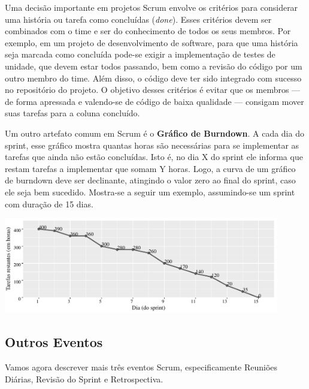 \documentclass[
  11pt,
  twoside]{book}
\let\origfigure\figure
\let\endorigfigure\endfigure
\renewenvironment{figure}[1][2] {
    \expandafter\origfigure\expandafter[!h]
} {
    \endorigfigure
}
\begin{document}

Uma decisão importante em projetos Scrum envolve os critérios para
considerar uma história ou tarefa como concluídas (\emph{done}). Esses
critérios devem ser combinados com o time e ser do conhecimento de todos
os seus membros. Por exemplo, em um projeto de desenvolvimento de
software, para que uma história seja marcada como concluída pode-se
exigir a implementação de testes de unidade, que devem estar todos
passando, bem como a revisão do código por um outro membro do time. Além
disso, o código deve ter sido integrado com sucesso no repositório do
projeto. O objetivo desses critérios é evitar que os membros --- de
forma apressada e valendo-se de código de baixa qualidade --- consigam
mover suas tarefas para a coluna concluído.

 

Um outro artefato comum em Scrum é o \textbf{Gráfico de Burndown}. A
cada dia do sprint, esse gráfico mostra quantas horas são necessárias
para se implementar as tarefas que ainda não estão concluídas. Isto é,
no dia X do sprint ele informa que restam tarefas a implementar que
somam Y horas. Logo, a curva de um gráfico de burndown deve ser
declinante, atingindo o valor zero ao final do sprint, caso ele seja bem
sucedido. Mostra-se a seguir um exemplo, assumindo-se um sprint com
duração de 15 dias.

\begin{figure}
\centering
\includegraphics[width=0.9\textwidth,height=\textheight]{figs/cap2/burndown.pdf}
\caption{Gráfico de Burndown, assumindo um sprint de 15 dias.}
\end{figure}

\hypertarget{outros-eventos}{%
\subsection{Outros Eventos}\label{outros-eventos}}

Vamos agora descrever mais três eventos Scrum, especificamente Reuniões
Diárias, Revisão do Sprint e Retrospectiva.
\end{document}
